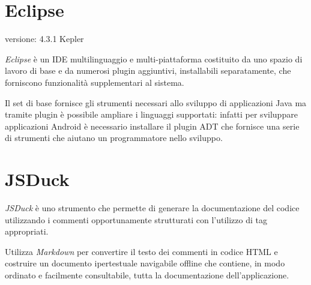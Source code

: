 \section{Eclipse}
\begin{description}
\item[versione: 4.3.1 Kepler]
\end{description}

\emph{Eclipse} è un \ac{IDE} multilinguaggio e multi-piattaforma costituito da uno spazio di lavoro di base e da numerosi plugin aggiuntivi, installabili separatamente, che forniscono funzionalità supplementari al sistema.

Il set di base fornisce gli strumenti necessari allo sviluppo di applicazioni Java ma tramite plugin è possibile ampliare i linguaggi supportati: infatti per sviluppare applicazioni Android è necessario installare il plugin \ac{ADT} che fornisce una serie di strumenti che aiutano un programmatore nello sviluppo.

\section{JSDuck}
\emph{JSDuck} è uno strumento che permette di generare la documentazione del codice utilizzando i commenti opportunamente strutturati con l'utilizzo di tag appropriati.

Utilizza \emph{Markdown} \cite{daringFireball:markdown} per convertire il testo dei commenti in codice \ac{HTML} e costruire un documento ipertestuale navigabile offline che contiene, in modo ordinato e facilmente consultabile, tutta la documentazione dell'applicazione.